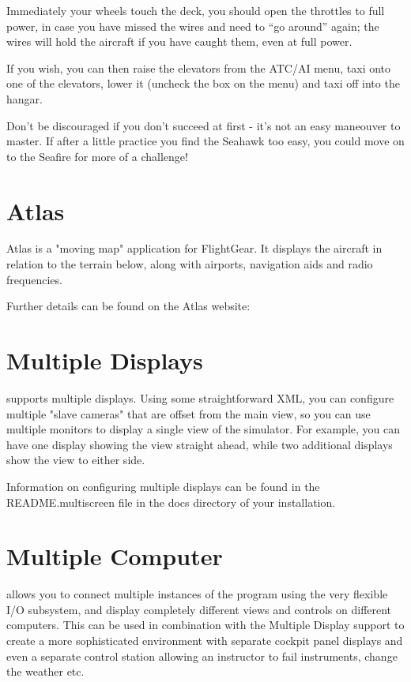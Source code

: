 Immediately your wheels touch the deck, you should open the throttles to full power, in case you have
missed the wires and need to ``go around'' again; the wires will hold the aircraft if you have caught them,
even at full power.

If you wish, you can then raise the elevators from the ATC/AI menu, taxi onto one of the elevators,
lower it (uncheck the box on the menu) and taxi off into the hangar.

Don't be discouraged if you don't succeed at first - it's not an easy maneouver to master. If after a little
practice you find the Seahawk too easy, you could move on to the Seafire for more of a challenge!


\section{Atlas\label{Atlas}}

Atlas is a "moving map" application for FlightGear. It displays the aircraft in relation to the terrain below,
along with airports, navigation aids and radio frequencies.

Further details can be found on the Atlas website:

\noindent
{}

\section{Multiple Displays}

\FlightGear{} supports multiple displays. Using some straightforward
 XML, you can configure multiple "slave cameras" that are offset from
the main view, so you can use multiple monitors to display a
single view of the simulator. For example, you can have one display
showing the view straight ahead, while two additional displays show
the view to either side.

Information on configuring multiple displays can be found in the
README.multiscreen file in the docs directory of your \FlightGear{}
installation.

\section{Multiple Computer}

\FlightGear{} allows you to connect multiple instances of the program
using the very flexible I/O subsystem, and display completely different views
 and controls on different computers. This can be used in combination
 with the Multiple Display support to create a more sophisticated environment
 with separate cockpit panel displays and even a separate control
station allowing an instructor to fail instruments, change the weather etc.

